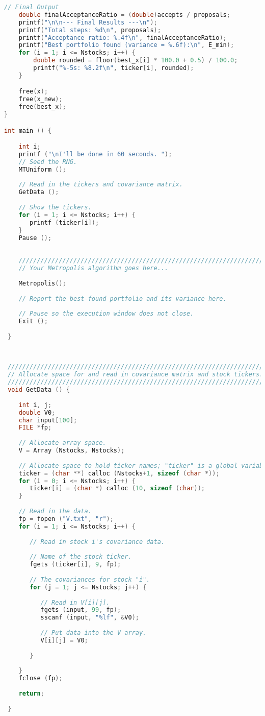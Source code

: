 \documentclass{report}
\begin{document}
\begin{lstlisting}[language=c++]
    // Final Output
    double finalAcceptanceRatio = (double)accepts / proposals;
    printf("\n\n--- Final Results ---\n");
    printf("Total steps: %d\n", proposals);
    printf("Acceptance ratio: %.4f\n", finalAcceptanceRatio);
    printf("Best portfolio found (variance = %.6f):\n", E_min);
    for (i = 1; i <= Nstocks; i++) {
        double rounded = floor(best_x[i] * 100.0 + 0.5) / 100.0;
        printf("%-5s: %8.2f\n", ticker[i], rounded);
    }

    free(x);
    free(x_new);
    free(best_x);
}

int main () {

    int i;
    printf ("\nI'll be done in 60 seconds. ");
    // Seed the RNG.
    MTUniform ();
 
    // Read in the tickers and covariance matrix.
    GetData ();
 
    // Show the tickers.
    for (i = 1; i <= Nstocks; i++) {
       printf (ticker[i]);
    }
    Pause ();
 
 
    /////////////////////////////////////////////////////////////////////////////
    // Your Metropolis algorithm goes here...
 
    Metropolis();
 
    // Report the best-found portfolio and its variance here.
 
    // Pause so the execution window does not close.
    Exit ();
 
 }
 
 
 
 ////////////////////////////////////////////////////////////////////////////////
 // Allocate space for and read in covariance matrix and stock tickers.
 ////////////////////////////////////////////////////////////////////////////////
 void GetData () {
 
    int i, j;
    double V0;
    char input[100];
    FILE *fp;
 
    // Allocate array space.
    V = Array (Nstocks, Nstocks);
 
    // Allocate space to hold ticker names; "ticker" is a global variable.
    ticker = (char **) calloc (Nstocks+1, sizeof (char *));
    for (i = 0; i <= Nstocks; i++) {
       ticker[i] = (char *) calloc (10, sizeof (char));
    }
 
    // Read in the data.
    fp = fopen ("V.txt", "r");
    for (i = 1; i <= Nstocks; i++) {
 
       // Read in stock i's covariance data.
 
       // Name of the stock ticker.
       fgets (ticker[i], 9, fp);
 
       // The covariances for stock "i".
       for (j = 1; j <= Nstocks; j++) {
 
          // Read in V[i][j].
          fgets (input, 99, fp);
          sscanf (input, "%lf", &V0);
 
          // Put data into the V array.
          V[i][j] = V0;
 
       }
 
    }
    fclose (fp);
 
    return;
 
 }
\end{lstlisting}
\pagebreak
\end{document}
